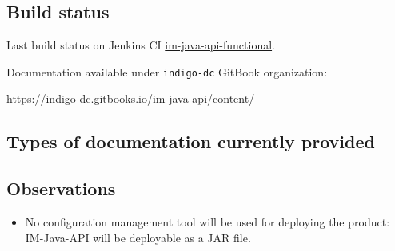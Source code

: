 \documentclass[a4wide,11pt]{article}
\begin{document}

\label{sec:func_int_test}

\subsection{Build status}
Last build status on Jenkins CI
\href{https://jenkins.indigo-datacloud.eu:8080//job/im-java-api-functional/6}{im-java-api-functional}.




\label{sec:gitbook}
Documentation available under \texttt{indigo-dc} GitBook organization: \vspace{0.1em} \begin{center}\url{https://indigo-dc.gitbooks.io/im-java-api/content/}\end{center} 
\subsection{Types of documentation currently provided}
\begin{center}
\end{center}



\label{sec:configuration}



\subsection{Observations}
\begin{itemize}
        \item No configuration management tool will be used for deploying the product: IM-Java-API will be deployable as a JAR file.
    \end{itemize}


\newpage

\end{document}
